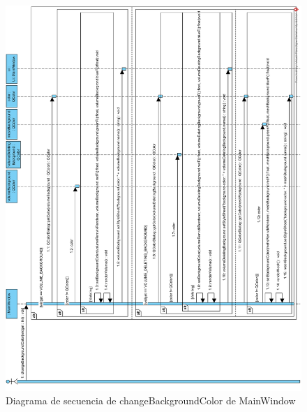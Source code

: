 \begin{figure}[H]
	\centering
	\includegraphics[width=12cm]{imagenes/diagramas/secuencia/MainWindow_ChangeBackgroundColor}
	\caption{Diagrama de secuencia de changeBackgroundColor de MainWindow}
	\label{fig:diagrama_secuencia_mainWindow_changeBackgroundColor}
\end{figure}

